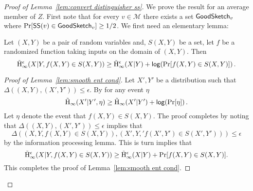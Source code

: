 \begin{proof}[Proof of Lemma~\ref{lem:convert distinguisher ss}]
We prove the result for an average member of $Z$.  First note that for every $v\in \mathcal{M}$ there exists a set $\mathsf{GoodSketch}_v$ where $\Pr[{\mathsf{SS}}(v)\in \mathsf{GoodSketch}_v] \ge 1/2$.  We first need an elementary lemma: 
\begin{lemma}
Let $(X, Y)$ be a pair of random variables and, $S(X, Y)$ be a set, let $f$ be a randomized function taking inputs on the domain of $(X, Y)$. Then 
\[
\tilde{\mathrm{H}}_\infty^\epsilon(X|Y, f(X, Y) \in S(X, Y))\ge \tilde{\mathrm{H}}_\infty^\epsilon(X|Y) + \mathsf{log}\!\left( \Pr[f(X, Y) \in S(X, Y)]\right).
\]
\label{lem:smooth ent cond}
\end{lemma}
\begin{proof}[Proof of Lemma~\ref{lem:smooth ent cond}]
Let $X', Y'$ be a distribution such that $\Delta((X, Y), (X', Y')) \le \epsilon$.  By \cite[Lemma 7.8]{fuller2020fuzzy} for any event $\eta$
\begin{align*}
\tilde{\mathrm{H}}_\infty(X'| Y', \eta) \ge \tilde{\mathrm{H}}_\infty(X' | Y') +\mathsf{log}\!\left(\Pr[\eta]\right).
\end{align*}
Let $\eta$ denote the event that $f(X, Y) \in S(X, Y)$.
The proof completes by noting that $\Delta((X, Y), (X', Y'))\le \epsilon$ implies that 
\[
\Delta((X, Y, f(X, Y) \in S(X, Y)), (X', Y,' f(X', Y')\in S(X', Y')))\le \epsilon\] by the information processing lemma. This is turn implies that 
\[
\tilde{\mathrm{H}}_\infty^\epsilon(X|Y, f(X, Y) \in S(X, Y))\ge \tilde{\mathrm{H}}_\infty^\epsilon(X|Y) +\Pr[f(X, Y) \in S(X, Y)].
\]
This completes the proof of Lemma~\ref{lem:smooth ent cond}.
\end{proof}


\end{proof}
